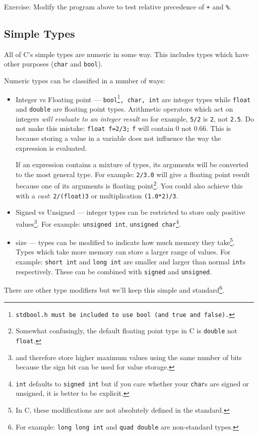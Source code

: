 \noindent Exercise: Modify the program above to test relative precedence of \texttt{+} and \texttt{\%}.

\subsection{Simple Types}
All of C's simple types are numeric in some way.
This includes types which have other purposes (\texttt{char} and \texttt{bool}).

Numeric types can be classified in a number of ways:
\begin{itemize}
 \item Integer vs Floating point --- \texttt{bool\footnote{\texttt{stdbool.h} must be included to use \texttt{bool} (and \texttt{true} and \texttt{false}).}, char, int} are integer types while \texttt{float} and \texttt{double} are floating point types.
Arithmetic operators which act on integers \emph{will evaluate to an integer result} so for example, \texttt{5/2} is \texttt{2}, not \texttt{2.5}.
Do not make this mistake:
\texttt{float f=2/3;}
\texttt{f} will contain $0$ not $0.66$.
This is because storing a value in a variable does not influence the way the expression is evaluated.

If an expression contains a mixture of types, its arguments will be converted to the most general type.
For example:
\texttt{2/3.0} will give a floating point result because one of its arguments is floating point\footnote{Somewhat confusingly, the default floating point type in C is \texttt{double} not \texttt{float}.}.
You could also achieve this with a \emph{cast}: \texttt{2/(float)3} or multiplication \texttt{(1.0*2)/3}.

 \item Signed vs Unsigned --- integer types can be restricted to store only positive values\footnote{and therefore store higher maximum values using the same number of bits because the sign bit can be used for value storage.}.
 For example: \texttt{unsigned int}, \texttt{unsigned char}\footnote{\texttt{int} defaults to \texttt{signed int} but if you care whether your \texttt{char}s are signed or unsigned, it is better to be explicit.}.
 
 \item size --- types can be modified to indicate how much memory they take\footnote{In C, these modifications are not absolutely defined in the standard.}. 
 Types which take more memory can store a larger range of values.
 For example:  \texttt{short int} and \texttt{long int} are smaller and larger than normal \texttt{int}s respectively.
 These can be combined with \texttt{signed} and \texttt{unsigned}.
\end{itemize}
There are other type modifiers but we'll keep this simple and standard\footnote{For example: \texttt{long long int}  and \texttt{quad double} are non-standard types.}.


